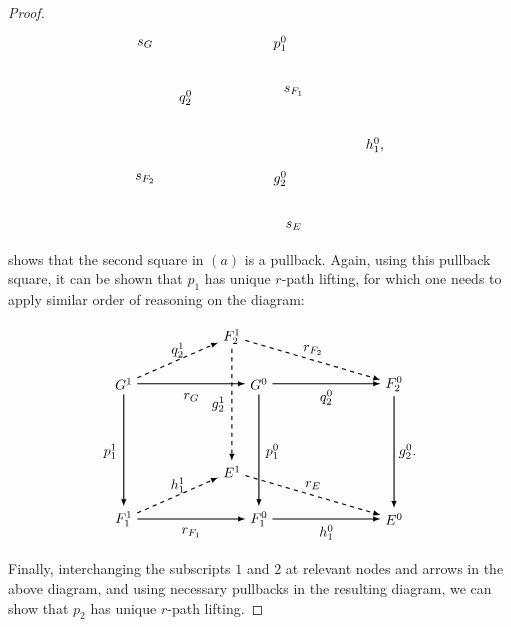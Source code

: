 \documentclass[10pt,a4paper]{amsart}
\begin{document}
\begin{proof}
\[\begin{tikzpicture}[scale=1.7]
\node at (3,-0.2) {$s_{F_1}$};
\node at (3,-2.2) {$s_E$};
\node at (4.2,-1) {$h_1^0$,};

\node at (0.8,0.5) {$s_G$};
\node at (0.8,-1.5) {$s_{F_2}$};
\node at (2.8,0.5) {$p_1^0$};
\node at (2.8,-1.5) {$g_2^0$};

\node at (1.4,-0.3) {$q_2^0$};

\end{tikzpicture}
\] shows that the second square in $(a)$ is a pullback. Again, using this pullback square, it can be shown that $p_1$ has unique $r$-path lifting, for which one needs to apply similar order of reasoning on the diagram:

\[
\begin{tikzpicture}[scale=1.7]
\node[] (A1) at (0,0) {$G^1$};
\node[] (A2) at (2,0) {$G^0$};
\node[] (A3) at (0,-2) {$F_1^1$};
\node[] (A4) at (2,-2) {$F_1^0$};

\node[] (B1) at (1.6,0.7) {$F_2^1$};
\node[] (B2) at (4,0) {$F_2^0$};
\node[] (B3) at (1.6,-1.3) {$E^1$};
\node[] (B4) at (4,-2) {$E^0$};

\path[->, black, >=latex,thick] (A1) edge [] node[]{} (A2);
\path[->, black, >=latex,thick] (A3) edge [] node[]{} (A4);
\path[->, black, >=latex,thick] (A1) edge [] node[]{} (A3);
\path[->, black, >=latex,thick] (A2) edge [] node[]{} (A4);

\path[->,black, dashed, >=latex,thick] (B1) edge [] node[]{} (B3);
\path[->,black, >=latex,thick] (A4) edge [] node[]{} (B4);
\path[->,black, >=latex,thick] (A2) edge [] node[]{} (B2);
\path[->,black, >=latex,thick] (B2) edge [] node[]{} (B4);

\path[->,black, dashed, >=latex,thick] (A1) edge [] node {} (B1);
\path[->,black, dashed, >=latex,thick] (A3) edge [] node {} (B3);
\path[->,black, dashed, >=latex,thick] (B1) edge [] node {} (B2);
\path[->,black, dashed, >=latex,thick] (B3) edge [] node {} (B4);

\node at (1,-0.2) {$r_G$};
\node at (1,-2.2) {$r_{F_1}$};
\node at (-0.2,-1) {$p_1^1$};
\node at (2.2,-1) {$p_1^0$};

\node at (3,-0.2) {$q_2^0$};
\node at (3,-2.2) {$h_1^0$};
\node at (4.2,-1) {$g_2^0$.};

\node at (0.8,0.5) {$q_2^1$};
\node at (0.8,-1.5) {$h_1^1$};
\node at (2.8,0.5) {$r_{F_2}$};
\node at (2.8,-1.5) {$r_E$};

\node at (1.4,-0.3) {$g_2^1$};

\end{tikzpicture}
\] Finally, interchanging the subscripts $1$ and $2$ at relevant nodes and arrows in the above diagram, and using necessary pullbacks in the resulting diagram, we can show that $p_2$ has unique $r$-path lifting. 
\end{proof}
\end{document}
